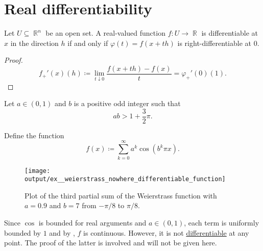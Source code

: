 \section{Real differentiability}\label{sec:real_differentiability}

\begin{proposition}\label{thm:real_valued_differentiability}
  Let \( U \subseteq \BbbR^n \) be an open set. A real-valued function \( f: U \to \BbbR \) is differentiable at \( x \) in the direction \( h \) if and only if \( \varphi(t) = f(x + th) \) is right-differentiable at \( 0 \).
\end{proposition}
\begin{proof}
  \begin{equation*}
    f_+'(x)(h) \coloneqq \lim_{t \downarrow 0} \frac {f(x + th) - f(x)} t = \varphi_+'(0)(1).
  \end{equation*}
\end{proof}

\begin{example}\label{ex:weierstrass_nowhere_differentiable_function}
  Let \( a \in (0, 1) \) and \( b \) is a positive odd integer such that
  \begin{equation*}
    ab > 1 + \frac 3 2 \pi.
  \end{equation*}

  Define the function
  \begin{equation*}
    f(x) \coloneqq \sum_{k=0}^\infty a^k \cos(b^k \pi x).
  \end{equation*}

  \begin{figure}[!ht]
    \centering
    \texttt{[image: output/ex\_\_weierstrass\_nowhere\_differentiable\_function]}
    \caption
    {
      Plot of the third partial sum of the Weierstrass function with \( a = 0.9 \) and \( b = 7 \) from \( -\pi / 8 \) to \( \pi / 8 \).
    }
    \label{fig:ex:weierstrass_nowhere_differentiable_function/plot}
  \end{figure}

  Since \( \cos \) is bounded for real arguments and \( a \in (0, 1) \), each term is uniformly bounded by \( 1 \) and by , \( f \) is continuous. However, it is not \hyperref[def:differentiability]{differentiable} at any point. The proof of the latter is involved and will not be given here.
\end{example}

